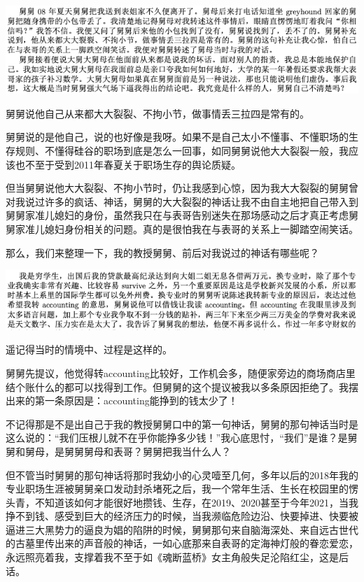 \documentclass[9pt, b5paper]{article}
\begin{document}
\begin{center}
\includegraphics[width=.9\linewidth]{./pic/p1p120-5.png}
\end{center}

舅舅说他自己从来都大大裂裂、不拘小节，做事情丢三拉四是常有的。 

舅舅说的是他自己，说的也好像是我呀。如果不是自己太小不懂事、不懂职场的生存规则、不懂得硅谷的职场到底是怎么一回事，如同舅舅说他大大裂裂一般，我应该也不至于受到2011年春夏关于职场生存的舆论质疑。 

但当舅舅说他大大裂裂、不拘小节时，仍让我感到心惊，因为我大大裂裂的舅舅曾对我说过许多的疯话、神话，舅舅的大大裂裂的神话让我不由自主地把自己带入到舅舅家准儿媳妇的身份，虽然我只在与表哥告别迷失在那场感动之后才真正考虑舅舅家准儿媳妇身份相关的问题。真的是很怕我在与表哥的关系上一脚踏空闹笑话。 

那么，我们来整理一下，我的教授舅舅、前后对我说过的神话有哪些呢？

\begin{center}
\includegraphics[width=.9\linewidth]{./pic/p1p127.png}
\end{center}

遥记得当时的情境中、过程是这样的。

舅舅先提议，他觉得转accounting比较好，工作机会多，随便家旁边的商场商店里结个账什么的都可以找得到工作。但舅舅的这个提议被我以多条原因拒绝了。我摆出来的第一条原因是：accounting能挣到的钱太少了！

不记得那是不是出自己于我的教授舅舅口中的第一句神话，舅舅的那句神话当时是这么说的：“我们压根儿就不在乎你能挣多少钱！”我心底思忖，“我们”是谁？是舅舅和舅母，是舅舅舅母和表哥？舅舅把我当什么人？

但不管当时舅舅的那句神话将那时我幼小的心灵噎至几何，多年以后的2018年我的专业职场生涯被舅舅亲口发动封杀堵死之后，我一个常年生活、生长在校园里的愣头青，不知道该如何才能很好地攒钱、生存，在2019、2020甚至于今年2021，当我挣不到钱、感受到巨大的经济压力的时候，当我濒临危险边沿、快要掉进、快要被逼进三大黑势力的逼良为娼的陷阱的时候，舅舅那句来自脑海深处、来自远古世代的古墓里传出来的声音般的神话，一如心底那来自表哥的定海神灯般的眷恋爱恋，永远照亮着我，支撑着我不至于如《魂断蓝桥》女主角般失足沦陷红尘，这是后话。
\end{document}
